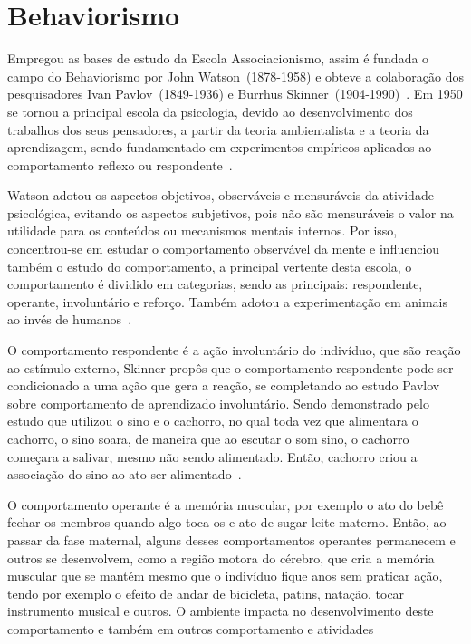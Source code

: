 \section{Behaviorismo}\label{behaviorismo}

Empregou as bases de estudo da Escola Associacionismo, assim é fundada o campo do Behaviorismo por John Watson~(1878-1958) e obteve a colaboração dos pesquisadores Ivan Pavlov~(1849-1936) e Burrhus Skinner~(1904-1990)~\cite{hothersall1997historia,sternberg2000psicologia}.
Em 1950 se tornou a principal escola da psicologia, devido ao desenvolvimento dos trabalhos dos seus pensadores, a partir da teoria ambientalista e a teoria da aprendizagem, sendo fundamentado em experimentos empíricos aplicados ao comportamento reflexo ou respondente~\cite{bock1999psicologias}.

Watson adotou os aspectos objetivos, observáveis e mensuráveis da atividade psicológica, evitando os aspectos subjetivos, pois não são mensuráveis o valor na utilidade para os conteúdos ou mecanismos mentais internos. 
Por isso, concentrou-se em estudar o comportamento observável da mente e influenciou também o estudo do comportamento, a principal vertente desta escola, o comportamento é dividido em categorias, sendo as principais: respondente, operante, involuntário e reforço.
Também adotou a experimentação em animais ao invés de humanos~\cite{bock1999psicologias,sternberg2000psicologia}.

O comportamento respondente é a ação involuntário do indivíduo, que são reação ao estímulo externo, Skinner propôs que o comportamento respondente pode ser condicionado a uma ação que gera a reação, se completando ao estudo Pavlov sobre comportamento de aprendizado involuntário.
Sendo demonstrado pelo estudo que utilizou o sino e o cachorro, no qual toda vez que alimentara o cachorro, o sino soara, de maneira que ao escutar o som sino, o cachorro começara a salivar, mesmo não sendo alimentado.
Então, cachorro criou a associação do sino ao ato ser alimentado~\cite{sternberg2000psicologia,silva2007psicologia_educacao}. 

O comportamento operante é a memória muscular, por exemplo o ato do bebê fechar os membros quando algo toca-os e ato de sugar leite materno.
Então, ao passar da fase maternal, alguns desses comportamentos operantes permanecem e outros se desenvolvem, como a região motora do cérebro, que cria a memória muscular que se mantém mesmo que o indivíduo fique anos sem praticar ação, tendo por exemplo o efeito de andar de bicicleta, patins, natação, tocar instrumento musical e outros. 
O ambiente impacta no desenvolvimento deste comportamento e também em outros comportamento e atividades~\cite{bock1999psicologias}

